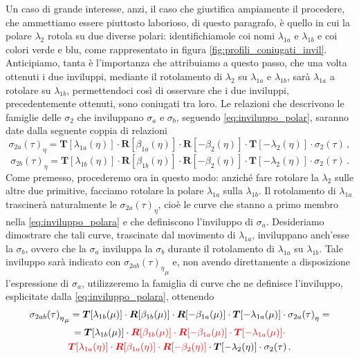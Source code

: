\noindent Un caso di grande interesse, anzi, il caso che giustifica ampiamente
il procedere, che ammettiamo essere piuttosto laborioso,
di questo paragrafo, \`e quello in cui la
polare $\lambda_2$ rotola su due diverse polari:
identifichiamole coi nomi $\lambda_{1a}$ e $\lambda_{1b}$ e coi
colori verde e blu, come rappresentato
in figura \ref{fig:profili_coniugati_invil}. Anticipiamo, tanta \`e l'importanza
che attribuiamo a questo passo, che una volta ottenuti i due inviluppi, mediante
il rotolamento di $\lambda_2$ su $\lambda_{1a}$ e $\lambda_{1b}$,
sar\`a $\lambda_{1a}$ a rotolare su $\lambda_{1b}$, permettendoci cos\`i di
osservare che i due inviluppi,
precedentemente ottenuti, sono coniugati tra loro.
Le relazioni che descrivono le famiglie delle $\sigma_2$
che inviluppano $\sigma_a$ e $\sigma_b$, seguendo \ref{eq:inviluppo_polar},
saranno date dalla seguente coppia di relazioni
\begin{equation}
{\sigma_{2a}(\tau)}_\eta = 
 {\bm T}[\lambda_{1a}(\eta)]\cdot {\bm R}[\beta_{1a}(\eta)]\cdot{\bm R}[-\beta_2(\eta)]\cdot
 {\bm T} [-\lambda_2(\eta)]\cdot \sigma_2(\tau)\,,
\label{eq:inviluppo_polara}
\end{equation}
\begin{equation}
{\sigma_{2b}(\tau)}_\eta = 
 {\bm T}[\lambda_{1b}(\eta)]\cdot {\bm R}[\beta_{1b}(\eta)]\cdot{\bm R}[-\beta_2(\eta)]\cdot
 {\bm T} [-\lambda_2(\eta)]\cdot \sigma_2(\tau)\,.
\label{eq:inviluppo_polarb}
\end{equation}
\noindent Come premesso, procederemo ora in questo modo: anzich\'e fare rotolare 
la $\lambda_2$ sulle altre due primitive, facciamo rotolare la polare
$\lambda_{1a}$ sulla $\lambda_{1b}$. Il rotolamento di $\lambda_{1a}$
trasciner\`a naturalmente le
$\sigma_{2a}(\tau)_\eta$, cio\`e le curve che stanno a primo membro nella
\ref{eq:inviluppo_polara} e che definiscono l'inviluppo di $\sigma_a$.
Desideriamo dimostrare che tali curve, trascinate
dal movimento di $\lambda_{1a}$, inviluppano anch'esse la $\sigma_{b}$,
ovvero che la $\sigma_a$ inviluppa la $\sigma_b$ durante il rotolamento di 
$\lambda_{1a}$ su $\lambda_{1b}$.
Tale inviluppo sar\`a indicato con ${{\sigma_{2ab}(\tau)}_\eta}_\mu$
e, non avendo direttamente a disposizione l'espressione 
di $\sigma_a$, utilizzeremo la famiglia di curve che ne definisce l'inviluppo,
esplicitate dalla \ref{eq:inviluppo_polara}, ottenendo
\begin{multline}
{{\sigma_{2ab}(\tau)}_\eta}_\mu = 
 {\bm T}[\lambda_{1b}(\mu)]\cdot {\bm R}[\beta_{1b}(\mu)]\cdot{\bm R}[-\beta_{1a}(\mu)]\cdot
 {\bm T} [-\lambda_{1a}(\mu)]\cdot {\sigma_{2a}(\tau)}_\eta = \\
 = 
 {\bm T}[\lambda_{1b}(\mu)]\cdot\color{red} {\bm R}[\beta_{1b}(\mu)]\cdot{\bm R}[-\beta_{1a}(\mu)]\cdot
 {\bm T} [-\lambda_{1a}(\mu)]\cdot \\
\color{red} {\bm T}[\lambda_{1a}(\eta)]\cdot {\bm R}[\beta_{1a}(\eta)]\cdot{\bm R}[-\beta_2(\eta)] \color{black}\cdot
 {\bm T} [-\lambda_2(\eta)]\cdot \sigma_2(\tau)\,.
\label{eq:inviluppo_polarb1}
\end{multline}
